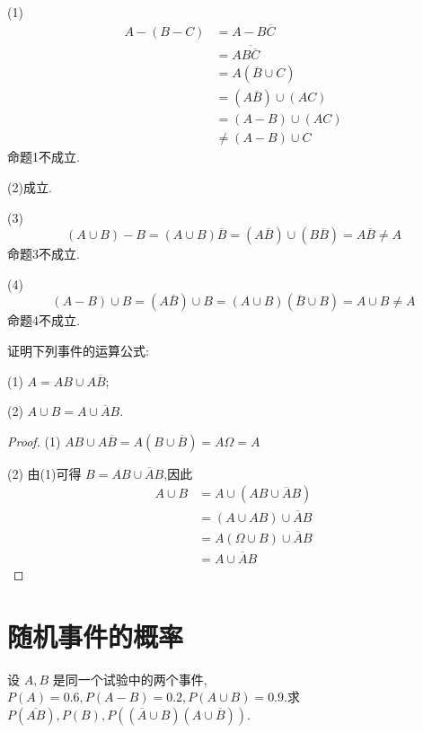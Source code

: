 \begin{solution}
    (1)
    $$
    \begin{aligned}
        A-(B-C) &= A - B \overline{C} \\
        &= A \overline{B \overline{C}} \\
        &= A (\overline{B} \cup C) \\
        &= (A \overline{B}) \cup (AC) \\
        &= (A-B) \cup (AC) \\
        & \not= (A-B) \cup C
    \end{aligned}
    $$
    命题1不成立.

    (2)成立.

    (3)
    $$
    (A \cup B) - B = (A \cup B) \overline{B} = (A \overline{B}) \cup (B \overline{B}) = A \overline{B} \not= A
    $$
    命题3不成立.

    (4)
    $$
    (A - B) \cup B = (A \overline{B}) \cup B = (A \cup B)(\overline{B} \cup B) = A \cup B \not= A
    $$
    命题4不成立.
\end{solution}

\vspace{1em}

\question 证明下列事件的运算公式:

(1) $A = AB \cup A \overline{B}$;

(2) $A \cup B = A \cup \overline{A} B$.

\begin{proof}
    (1) $AB \cup A \overline{B} = A(B \cup \overline{B}) = A \varOmega = A$

    (2) 由(1)可得 $B = AB \cup \overline{A} B$,因此
    $$
    \begin{aligned}
        A \cup B &= A \cup (AB \cup \overline{A} B) \\
        &= (A \cup AB) \cup \overline{A} B \\
        &= A(\varOmega \cup B) \cup \overline{A} B \\
        &= A \cup \overline{A} B
    \end{aligned}
    $$
\end{proof}

\section{随机事件的概率}


\question 设 $A,B$ 是同一个试验中的两个事件, $P(A)=0.6, P(A-B)=0.2, P(A \cup B) = 0.9$.求 $P(\overline{AB}), P(B), P((\overline{A} \cup B)(A \cup \overline{B}))$.

